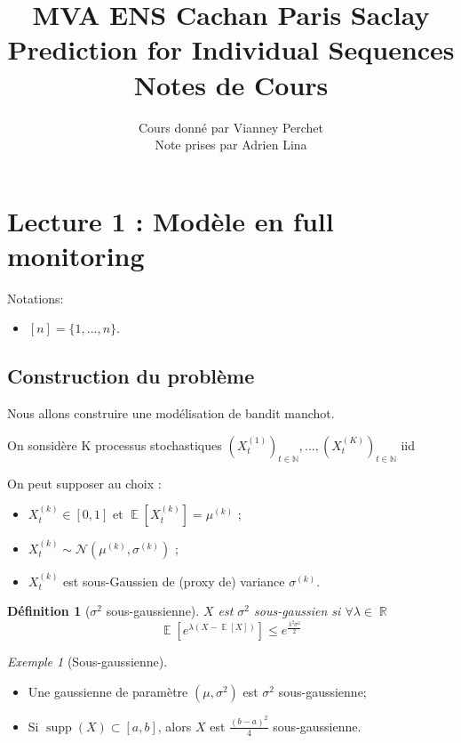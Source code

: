 \documentclass{article}
\DeclareMathOperator*{\supp}{supp}
\DeclareMathOperator*{\E}{\mathbb{E}}
\DeclareMathOperator*{\R}{\mathbb{R}}
\newtheorem{definition}{Définition}[section]
\theoremstyle{remark}
\newtheorem{example}{Exemple}[section]
\theoremstyle{remark}
\begin{document}
\title{%
  \large MVA ENS Cachan Paris Saclay \\
  \huge Prediction for Individual Sequences\\ Notes de Cours \\
}
\author{%
  Cours donné par Vianney Perchet \\
  Note prises par Adrien Lina
}

\maketitle

\section{Lecture 1 : Modèle en full monitoring}

Notations:
\begin{itemize}
  \item $[n] = \{1, ..., n\}$.
\end{itemize}

\subsection{Construction du problème}

Nous allons construire une modélisation de bandit manchot.

On sonsidère K processus stochastiques
$(X^{(1)}_t)_{t\in \mathbb{N}}, ..., (X^{(K)}_t)_{t\in \mathbb{N}}$ iid

On peut supposer au choix :
\begin{itemize}
  \item $X^{(k)}_t \in [0,1]$
  et
  $\E[X^{(k)}_t] = \mu^{(k)}$ ;
  \item $X^{(k)}_t \sim \mathcal{N}(\mu^{(k)}, \sigma^{(k)})$ ;
  \item $X^{(k)}_t$ est sous-Gaussien de (proxy de) variance $\sigma^{(k)}$.
\end{itemize}

\begin{definition}[$\sigma^2$ sous-gaussienne]
  \label{def:sous_gaussienne}
  $X$ est $\sigma^2$ sous-gaussien si $\forall \lambda \in \R$
  $$\E\left[e^{\lambda(X-\E[X])}\right] \leq e^{\frac{\lambda^2 \sigma^2}{2}}$$
\end{definition}

\begin{example}[Sous-gaussienne] $ $ %
  \begin{itemize}
    \item Une gaussienne de paramètre $(\mu, \sigma^2)$ est $\sigma^2$ sous-gaussienne;
    \item Si $\supp(X) \subset [a,b]$, alors $X$ est $\frac{(b-a)^2}{4}$ sous-gaussienne.
  \end{itemize}
\end{example}
$$ $$ %
\end{document}
